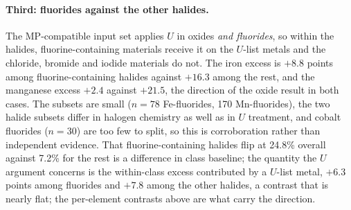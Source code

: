 \documentclass[11pt]{article}
\begin{document}
\paragraph{Third: fluorides against the other halides.} The MP-compatible input set applies $U$ in oxides
\emph{and fluorides}, so within the halides, fluorine-containing materials receive it on
the $U$-list metals and the chloride, bromide and iodide materials do not. The iron
excess is $+8.8$ points among fluorine-containing halides against $+16.3$ among the
rest, and the manganese excess $+2.4$ against $+21.5$, the direction of the oxide result
in both cases. The subsets are small ($n=78$ Fe-fluorides, 170 Mn-fluorides), the two
halide subsets differ in halogen chemistry as well as in $U$ treatment, and cobalt
fluorides ($n=30$) are too few to split, so this is
corroboration rather than independent evidence. That
fluorine-containing halides flip at 24.8\% overall against 7.2\% for the rest is a
difference in class baseline; the quantity the $U$ argument concerns is the within-class
excess contributed by a $U$-list metal, $+6.3$ points among fluorides and $+7.8$ among
the other halides, a contrast that is nearly flat; the per-element contrasts above are
what carry the direction.
\end{document}
